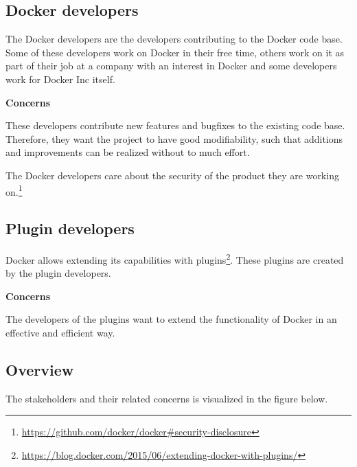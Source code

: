 \subsection*{Docker developers}
The Docker developers are the developers contributing to the Docker code base. Some of these developers work on Docker in their free time, others work on it as part of their job at a company with an interest in Docker and some developers work for Docker Inc itself\cite{whoaredockerdevs}.

\textbf{Concerns}
\begin{description}[labelindent=25pt,style=multiline,leftmargin=4.0cm,font=\normalfont\itshape]

\item[\textbf{Maintainability}] These developers contribute new features and bugfixes to the existing code base. Therefore, they want the project to have good modifiability, such that additions and improvements can be realized without to much effort.


\item[\textbf{Security}] The Docker developers care about the security of the product they are working on.\footnote{\url{https://github.com/docker/docker\#security-disclosure}}  %

\end{description}

\subsection*{Plugin developers}
Docker allows extending its capabilities with plugins\footnote{\url{https://blog.docker.com/2015/06/extending-docker-with-plugins/}}. These plugins are created by the plugin developers.

\textbf{Concerns}
\begin{description}[labelindent=25pt,style=multiline,leftmargin=4.0cm,font=\normalfont\itshape]

\item[\textbf{Portability}: (Adaptability)] The developers of the plugins want to extend the functionality of Docker in an effective and efficient way. 

\end{description}

\subsection*{Overview}
The stakeholders and their related concerns is visualized in the figure below.

